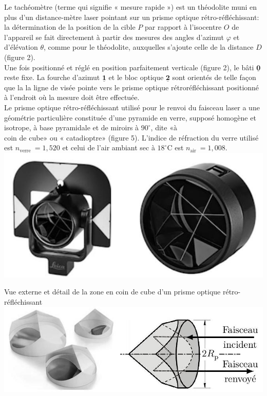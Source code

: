 \documentclass[10pt]{article}
\begin{document}
Le tachéomètre (terme qui signifie « mesure rapide ») est un théodolite muni en plus d'un distance-mètre laser pointant sur un prisme optique rétro-réfléchissant: la détermination de la position de la cible $P$ par rapport à l'isocentre $O$ de l'appareil se fait directement à partir des mesures des angles d'azimut $\varphi$ et d'élévation $\theta$, comme pour le théodolite, auxquelles s'ajoute celle de la distance $D$ (figure 2).\\
Une fois positionné et réglé en position parfaitement verticale (figure 2), le bâti $\underline{\mathbf{0}}$ reste fixe. La fourche d'azimut $\underline{\mathbf{1}}$ et le bloc optique $\underline{\mathbf{2}}$ sont orientés de telle façon que la la ligne de visée pointe vers le prisme optique rétroréfléchissant positionné à l'endroit où la mesure doit être effectuée.\\
Le prisme optique rétro-réfléchissant utilisé pour le renvoi du faisceau laser a une géométrie particulière constituée d'une pyramide en verre, supposé homogène et isotrope, à base pyramidale et de miroirs à $90^{\circ}$, dite «à\\
coin de cube» ou « catadioptre» (figure 5). L'indice de réfraction du verre utilisé est $n_{\text {verre }}=1,520$ et celui de l'air ambiant sec à $18^{\circ} \mathrm{C}$ est $n_{\text {air }}=1,008$.\\
\includegraphics[max width=\textwidth, center]{2024_12_07_51b7f57c7f055c2d8d29g-04}

Vue externe et détail de la zone en coin de cube d'un prisme optique rétro-réfléchissant\\
\includegraphics[max width=\textwidth, center]{2024_12_07_51b7f57c7f055c2d8d29g-04(1)}
\end{document}
